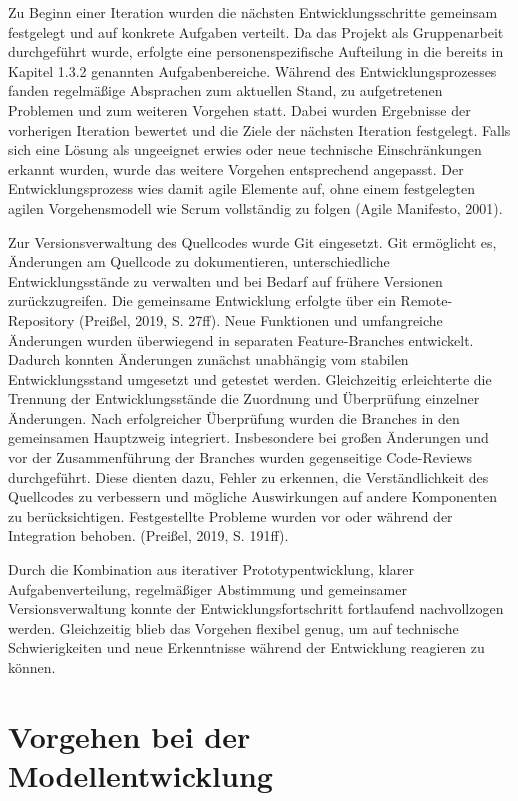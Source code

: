 Zu Beginn einer Iteration wurden die nächsten Entwicklungsschritte gemeinsam festgelegt und auf konkrete Aufgaben verteilt. Da das Projekt als Gruppenarbeit durchgeführt wurde, erfolgte eine personenspezifische Aufteilung in die bereits in Kapitel 1.3.2 genannten Aufgabenbereiche. Während des Entwicklungsprozesses fanden regelmäßige Absprachen zum aktuellen Stand, zu aufgetretenen Problemen und zum weiteren Vorgehen statt. Dabei wurden Ergebnisse der vorherigen Iteration bewertet und die Ziele der nächsten Iteration festgelegt. Falls sich eine Lösung als ungeeignet erwies oder neue technische Einschränkungen erkannt wurden, wurde das weitere Vorgehen entsprechend angepasst. Der Entwicklungsprozess wies damit agile Elemente auf, ohne einem festgelegten agilen Vorgehensmodell wie Scrum vollständig zu folgen (Agile Manifesto, 2001).

Zur Versionsverwaltung des Quellcodes wurde Git eingesetzt. Git ermöglicht es, Änderungen am Quellcode zu dokumentieren, unterschiedliche Entwicklungsstände zu verwalten und bei Bedarf auf frühere Versionen zurückzugreifen. Die gemeinsame Entwicklung erfolgte über ein Remote-Repository (Preißel, 2019, S. 27ff). Neue Funktionen und umfangreiche Änderungen wurden überwiegend in separaten Feature-Branches entwickelt.  Dadurch konnten Änderungen zunächst unabhängig vom stabilen Entwicklungsstand umgesetzt und getestet werden. Gleichzeitig erleichterte die Trennung der Entwicklungsstände die Zuordnung und Überprüfung einzelner Änderungen. Nach erfolgreicher Überprüfung wurden die Branches in den gemeinsamen Hauptzweig integriert. Insbesondere bei großen Änderungen und vor der Zusammenführung der Branches wurden gegenseitige Code-Reviews durchgeführt. Diese dienten dazu, Fehler zu erkennen, die Verständlichkeit des Quellcodes zu verbessern und mögliche Auswirkungen auf andere Komponenten zu berücksichtigen. Festgestellte Probleme wurden vor oder während der Integration behoben. (Preißel, 2019, S. 191ff).

Durch die Kombination aus iterativer Prototypentwicklung, klarer Aufgabenverteilung, regelmäßiger Abstimmung und gemeinsamer Versionsverwaltung konnte der Entwicklungsfortschritt fortlaufend nachvollzogen werden. Gleichzeitig blieb das Vorgehen flexibel genug, um auf technische Schwierigkeiten und neue Erkenntnisse während der Entwicklung reagieren zu können.

\section{Vorgehen bei der Modellentwicklung}

